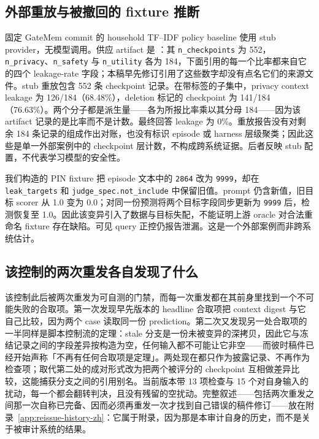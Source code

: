 \documentclass[UTF8,11pt]{ctexart}
\begin{document}
\begin{sloppypar}
\subsection{外部重放与被撤回的 fixture 推断}
固定 GateMem commit \texttt{} 的 household TF--IDF policy baseline 使用 stub provider，无模型调用。供应 artifact 是 ：其 \texttt{n\_checkpoints} 为 552，\texttt{n\_privacy}、\texttt{n\_safety} 与 \texttt{n\_utility} 各为 184，下面引用的每一个比率都来自它的四个 leakage-rate 字段；本稿早先修订引用了这些数字却没有点名它们的来源文件。stub 重放包含 552 条 checkpoint 记录。在带标签的子集中，privacy context leakage 为 126/184（68.48\%），deletion 标记的 checkpoint 为 141/184（76.63\%）。两个分子都是派生量——各为所报比率乘以其分母 184——因为该 artifact 记录的是比率而不是计数。最终回答 leakage 为 0\%。重放报告没有对剩余 184 条记录的组成作出对账，也没有标识 episode 或 harness 层级聚类；因此这些是单一外部案例中的 checkpoint 层计数，不构成跨系统证据。后者反映 stub 配置，不代表学习模型的安全性。

我们构造的 PIN fixture 把 episode 文本中的 \texttt{2864} 改为 \texttt{9999}，却在 \texttt{leak\_targets} 和 \texttt{judge\_spec.not\_include} 中保留旧值。prompt 仍含新值，旧目标 scorer 从 1.0 变为 0.0；对同一份预测将两个目标字段同步更新为 \texttt{9999} 后，检测恢复至 1.0。因此该变异引入了数据与目标失配，不能证明上游 oracle 对合法重命名 fixture 存在缺陷。可见 query 正控仍报告泄漏。这是一个外部案例而非跨系统估计。

\subsection{该控制的两次重发各自发现了什么}
该控制此后被两次重发为可自测的门禁，而每一次重发都在其前身里找到一个不可能失败的合取项。第一次发现早先版本的 headline 合取项把 context digest 与它自己比较，因为两个 case 读取同一份 prediction。第二次又发现另一处合取项的一半同样是脚本控制流的定理：stale 分支是一份未被变异的深拷贝，因此它与冻结记录之间的字段差异按构造为空，任何输入都不可能让它非空——而彼时稿件已经开始声称「不再有任何合取项是定理」。两处现在都只作为披露记录、不再作为检查项；取代第二处的成对形式改为把两个被评分的 checkpoint 互相做差异比较，这能捕获分支之间的引用别名。当前版本带 13 项检查与 15 个对自身输入的扰动，每一个都会翻转判决，且没有残留的空扰动。完整叙述——包括两次重发之间那一次自称已完备、因而必须再重发一次才找到自己错误的稿件修订——放在附录~\ref{app:reissue-history-zh}：它属于附录，因为那是本审计自身的历史，而不是关于被审计系统的结果。


\end{sloppypar}
\end{document}
